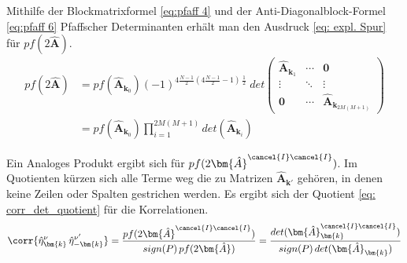 \noindent Mithilfe der Blockmatrixformel \eqref{eq:pfaff 4} und der Anti-Diagonalblock-Formel \eqref{eq:pfaff 6} Pfaffscher Determinanten erhält man den Ausdruck \eqref{eq: expl. Spur} für $pf(2\bm{\hat{A}}) $.
\begin{align}
pf(2\bm{\hat{A}}) 
    &= pf(\bm{\hat{A}}_{\bm{k}_0}) (-1)^{4\frac{N-1}{2} \left(4\frac{N-1}{2}-1 \right) \, \frac{1}{2}}
        \; det\left(\begin{array}{ccc}  
        \bm{\hat{A}}_{\bm{k}_1} & \cdots  & \bm{0} \\
        \vdots                  & \ddots  & \vdots \\
        \bm{0}                  & \cdots  & \bm{\hat{A}}_{\bm{k}_{2M(M+1)}} 
        \end{array} \right)  \nonumber \\
    &= pf(\bm{\hat{A}}_{\bm{k}_0}) \prod_{i = 1}^{2M(M+1)}  det(\bm{\hat{A}}_{\bm{k}_i}) \label{eq: expl. Spur}
\end{align}

\noindent Ein Analoges Produkt ergibt sich für $pf(2\bm{\hat{A}}^{\cancel{I} \cancel{I}})$. Im Quotienten kürzen sich alle Terme weg die zu Matrizen $\hat{\bm{A}}_{\bm{k'}}$ gehören, in denen keine Zeilen oder Spalten gestrichen werden. Es ergibt sich der Quotient \eqref{eq: corr_det_quotient} für die Korrelationen.
\begin{equation} \label{eq: corr_det_quotient}
\corr{\hat{\eta}_{\bm{k}}^{\nu}\, \hat{\eta}_{-\bm{k}}^{\nu'}} = \frac{pf(2\bm{\hat{A}}^{\cancel{I} \cancel{I}})}{sign(P)\,pf(2\bm{\hat{A}})} =  \frac{det(\bm{\hat{A}}_{\bm{k}}^{\cancel{I} \cancel{I}})}{sign(P)\,det(\bm{\hat{A}}_{\bm{k}})}
\end{equation}


